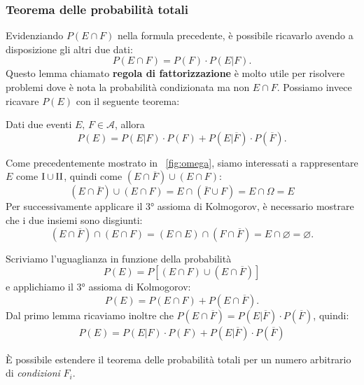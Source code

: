 \subsubsection{Teorema delle probabilità totali}
Evidenziando $P(E \cap F)$ nella formula precedente, è possibile ricavarlo avendo a disposizione gli altri due dati: \[
P(E \cap F) = P(F) \cdot P(E|F).
\]
Questo lemma chiamato \textbf{regola di fattorizzazione} è molto utile per risolvere problemi dove è nota la probabilità condizionata ma non $E \cap F$. Possiamo invece ricavare $P(E)$ con il seguente teorema:

\begin{teorema}
Dati due eventi $E, \, F \in \mathcal A$, allora \[
\boxed{P(E) = P(E|F) \cdot P(F) + P(E|\overline F) \cdot P(\overline F)}.
\]
\end{teorema}
\begin{dimostrazione}
Come precedentemente mostrato in \figurename \ \ref{fig:omega}, siamo interessati a rappresentare $E$ come $\textnormal{I} \cup \textnormal{II}$, quindi come $(E \cap \overline F) \cup (E \cap F)$:
\[
    (E \cap \overline F) \cup (E \cap F) =
    E \cap (\overline F \cup F)
    = E \cap \Omega = E \tag{distributività}
\]
Per successivamente applicare il 3° assioma di Kolmogorov, è necessario mostrare che i due insiemi sono disgiunti: \[
 (E \cap \overline F) \cap (E \cap F) =
 (E \cap E) \cap (F \cap \overline F) = E \cap \varnothing = \varnothing.
\]

\noindent Scriviamo l'uguaglianza in funzione della probabilità \[
P(E) = P[(E \cap F) \cup (E \cap \overline F)]
\]
e applichiamo il 3° assioma di Kolmogorov: \[
P(E) = P(E \cap F) + P(E \cap \overline F).
\]
Dal primo lemma ricaviamo inoltre che $P(E \cap \overline F) = P(E | \overline F) \cdot P(\overline F)$, quindi: \begin{align*}
P(E) = P(E|F) \cdot P(F) + P(E|\overline F) \cdot P(\overline F) \tag*{$\blacksquare$}
\end{align*}
\end{dimostrazione}

\noindent È possibile estendere il teorema delle probabilità totali per un numero arbitrario di \textit{condizioni} $F_i$.

